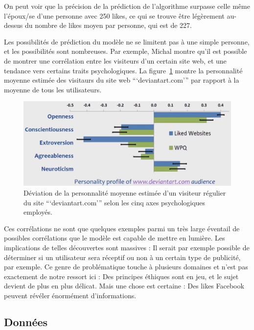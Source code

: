 		On peut voir que la précision de la prédiction de l'algorithme surpasse celle même l'époux/se d'une personne avec 250 likes, ce qui se trouve être légèrement au-dessus du nombre de likes moyen par personne, qui est de 227.

		Les possibilités de prédiction du modèle ne se limitent pas à une simple personne, et les possibilités sont nombreuses. Par exemple, Michal montre qu'il est possible de montrer une corrélation entre les visiteurs d'un certain site web, et une tendance vers certains traits psychologiques. La figure~\ref{a-talk2} montre la personnalité moyenne estimée des visitaurs du site web ```deviantart.com''' par rapport à la moyenne de tous les utilisateurs.

		\begin{figure}[ht]
			\centering
			\includegraphics[width=1\textwidth]{images/analysis/talk2}
			\caption{Déviation de la personnalité moyenne estimée d'un visiteur régulier du site ```deviantart.com''' selon les cinq axes psychologiques employés\cite{kosinski-talk}.}
			\label{a-talk2}
		\end{figure}

		Ces corrélations ne sont que quelques exemples parmi un très large éventail de possibles corrélations que le modèle est capable de mettre en lumière. Les implications de telles découvertes sont massives : Il serait par exemple possible de déterminer si un utilisateur sera réceptif ou non à un certain type de publicité, par exemple. Ce genre de problématique touche à plusieurs domaines et n'est pas exactement de notre ressort ici : Des principes éthiques sont en jeu, et le sujet devient de plus en plus délicat. Mais une chose est certaine : Des likes Facebook peuvent révéler énormément d'informations.

	\subsection{Données}

